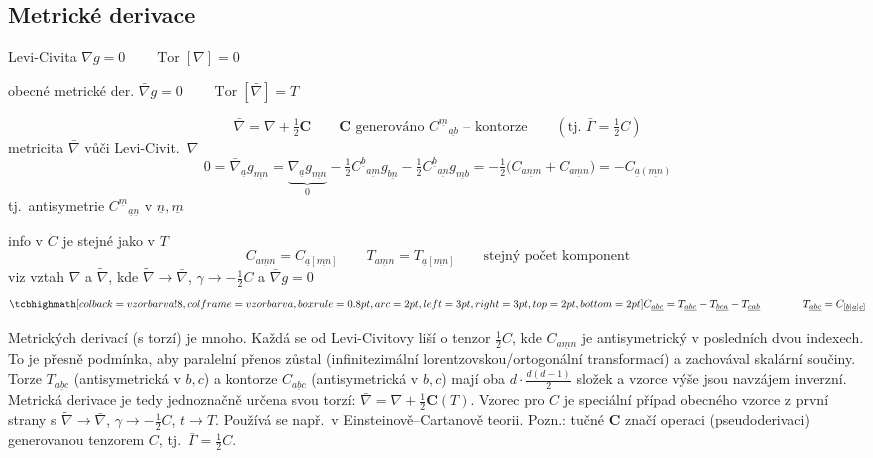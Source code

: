 \subsection{Metrické derivace}

Levi-Civita \qquad $\nabla g = 0 \qquad \operatorname{Tor}[\nabla] = 0$

obecné metrické der. \qquad $\bar\nabla g = 0 \qquad \operatorname{Tor}[\bar\nabla] = T$

\[
  \bar\nabla = \nabla + \tfrac12\mathbf{C} \qquad \mathbf{C} \text{ generováno } C^{\underline{m}}{}_{\underline{ab}} \text{ -- kontorze} \qquad (\text{tj. } \bar\Gamma = \tfrac12 C)
\]
metricita $\bar\nabla$ vůči Levi-Civit.\ $\nabla$
\[
  0 = \bar\nabla_{\underline{a}}g_{\underline{mn}} = \underbrace{\nabla_{\underline{a}}g_{\underline{mn}}}_{0} - \tfrac12 C^{\underline{b}}{}_{\underline{am}}g_{\underline{bn}} - \tfrac12 C^{\underline{b}}{}_{\underline{an}}g_{\underline{mb}}
  = -\tfrac12\big(C_{\underline{anm}} + C_{\underline{amn}}\big) = -C_{\underline{a}(\underline{mn})}
\]
\quad tj.\ antisymetrie $C^{\underline{m}}{}_{\underline{a}\underline{n}}$ v $\underline{n},\underline{m}$

info v $C$ je stejné jako v $T$
\[
  C_{\underline{amn}} = C_{\underline{a}[\underline{mn}]} \qquad T_{\underline{amn}} = T_{\underline{a}[\underline{mn}]} \qquad \text{stejný počet komponent}
\]
viz vztah $\nabla$ a $\tilde\nabla$, kde $\tilde\nabla\to\bar\nabla$, $\gamma\to-\frac12 C$ a $\bar\nabla g = 0$
\[
  \vzorec{C_{\underline{abc}} = T_{\underline{abc}} - T_{\underline{bca}} - T_{\underline{cab}}} \qquad\qquad T_{\underline{abc}} = C_{[\underline{b}|\underline{a}|\underline{c}]}
\]

\begin{vysvetleni}[Kontorze]
Metrických derivací (s torzí) je mnoho. Každá se od Levi-Civitovy liší o tenzor $\tfrac12C$, kde $C_{\underline{amn}}$ je antisymetrický v posledních dvou indexech. To je přesně podmínka, aby paralelní přenos zůstal  (infinitezimální lorentzovskou/ortogonální transformací) a zachovával skalární součiny.
Torze $T_{\underline{abc}}$ (antisymetrická v $b,c$) a kontorze $C_{\underline{abc}}$ (antisymetrická v $b,c$) mají oba $d\cdot\frac{d(d-1)}2$ složek a vzorce výše jsou navzájem inverzní. Metrická derivace je tedy jednoznačně určena svou torzí: $\bar\nabla=\nabla+\tfrac12\mathbf{C}(T)$. Vzorec pro $C$ je speciální případ obecného vzorce z první strany s $\tilde\nabla\to\bar\nabla$, $\gamma\to-\tfrac12C$, $t\to T$. Používá se např.\ v Einsteinově--Cartanově teorii.
Pozn.: tučné $\mathbf{C}$ značí operaci (pseudoderivaci) generovanou tenzorem $C$, tj.\ $\bar\Gamma=\tfrac12C$.
\end{vysvetleni}

